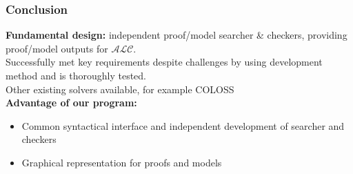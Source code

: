\begin{frame}
  \frametitle{Conclusion}
  \textbf{Fundamental design:} independent proof/model searcher \& checkers, providing proof/model outputs for $\mathcal{ALC}$.\\
  \smallskip
  Successfully met key requirements despite challenges by using development method and is thoroughly tested.\\
  \pause
  \bigskip
  Other existing solvers available, for example COLOSS \\
  \textbf{Advantage of our program:}
  \begin{itemize}
   \item Common syntactical interface and independent development of searcher and checkers
   \item Graphical representation for proofs and models
  \end{itemize}
\end{frame}

